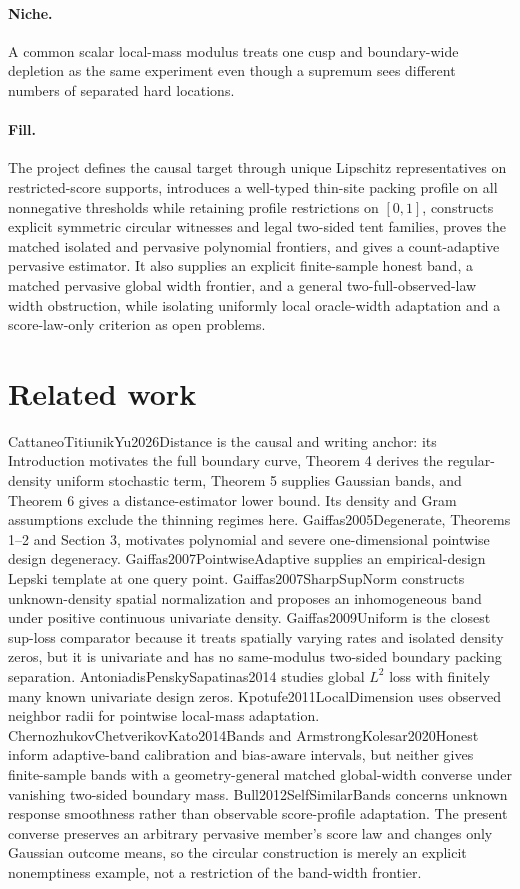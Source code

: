 \documentclass{article}
\begin{document}
\paragraph{Niche.} A common scalar local-mass modulus treats one cusp and boundary-wide depletion as the same experiment even though a supremum sees different numbers of separated hard locations.

\paragraph{Fill.} The project defines the causal target through unique Lipschitz representatives on restricted-score supports, introduces a well-typed thin-site packing profile on all nonnegative thresholds while retaining profile restrictions on \([0,1]\), constructs explicit symmetric circular witnesses and legal two-sided tent families, proves the matched isolated and pervasive polynomial frontiers, and gives a count-adaptive pervasive estimator. It also supplies an explicit finite-sample honest band, a matched pervasive global width frontier, and a general two-full-observed-law width obstruction, while isolating uniformly local oracle-width adaptation and a score-law-only criterion as open problems.

\section{Related work}

CattaneoTitiunikYu2026Distance is the causal and writing anchor: its Introduction motivates the full boundary curve, Theorem 4 derives the regular-density uniform stochastic term, Theorem 5 supplies Gaussian bands, and Theorem 6 gives a distance-estimator lower bound. Its density and Gram assumptions exclude the thinning regimes here. Gaiffas2005Degenerate, Theorems 1--2 and Section 3, motivates polynomial and severe one-dimensional pointwise design degeneracy. Gaiffas2007PointwiseAdaptive supplies an empirical-design Lepski template at one query point. Gaiffas2007SharpSupNorm constructs unknown-density spatial normalization and proposes an inhomogeneous band under positive continuous univariate density. Gaiffas2009Uniform is the closest sup-loss comparator because it treats spatially varying rates and isolated density zeros, but it is univariate and has no same-modulus two-sided boundary packing separation. AntoniadisPenskySapatinas2014 studies global \(L^2\) loss with finitely many known univariate design zeros. Kpotufe2011LocalDimension uses observed neighbor radii for pointwise local-mass adaptation. ChernozhukovChetverikovKato2014Bands and ArmstrongKolesar2020Honest inform adaptive-band calibration and bias-aware intervals, but neither gives finite-sample bands with a geometry-general matched global-width converse under vanishing two-sided boundary mass. Bull2012SelfSimilarBands concerns unknown response smoothness rather than observable score-profile adaptation. The present converse preserves an arbitrary pervasive member's score law and changes only Gaussian outcome means, so the circular construction is merely an explicit nonemptiness example, not a restriction of the band-width frontier.
\end{document}
